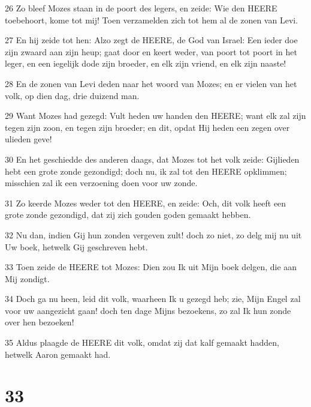 \par 26 Zo bleef Mozes staan in de poort des legers, en zeide: Wie den HEERE toebehoort, kome tot mij! Toen verzamelden zich tot hem al de zonen van Levi.
\par 27 En hij zeide tot hen: Alzo zegt de HEERE, de God van Israel: Een ieder doe zijn zwaard aan zijn heup; gaat door en keert weder, van poort tot poort in het leger, en een iegelijk dode zijn broeder, en elk zijn vriend, en elk zijn naaste!
\par 28 En de zonen van Levi deden naar het woord van Mozes; en er vielen van het volk, op dien dag, drie duizend man.
\par 29 Want Mozes had gezegd: Vult heden uw handen den HEERE; want elk zal zijn tegen zijn zoon, en tegen zijn broeder; en dit, opdat Hij heden een zegen over ulieden geve!
\par 30 En het geschiedde des anderen daags, dat Mozes tot het volk zeide: Gijlieden hebt een grote zonde gezondigd; doch nu, ik zal tot den HEERE opklimmen; misschien zal ik een verzoening doen voor uw zonde.
\par 31 Zo keerde Mozes weder tot den HEERE, en zeide: Och, dit volk heeft een grote zonde gezondigd, dat zij zich gouden goden gemaakt hebben.
\par 32 Nu dan, indien Gij hun zonden vergeven zult! doch zo niet, zo delg mij nu uit Uw boek, hetwelk Gij geschreven hebt.
\par 33 Toen zeide de HEERE tot Mozes: Dien zou Ik uit Mijn boek delgen, die aan Mij zondigt.
\par 34 Doch ga nu heen, leid dit volk, waarheen Ik u gezegd heb; zie, Mijn Engel zal voor uw aangezicht gaan! doch ten dage Mijns bezoekens, zo zal Ik hun zonde over hen bezoeken!
\par 35 Aldus plaagde de HEERE dit volk, omdat zij dat kalf gemaakt hadden, hetwelk Aaron gemaakt had.

\chapter{33}

